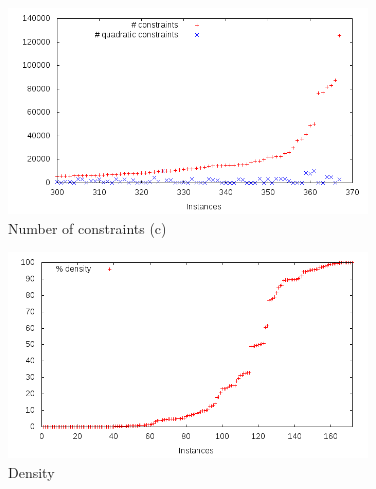 \begin{enumerate}
\begin{figure}\centering
  \includegraphics[width=0.85\textwidth]{pic_constr_big.png}
  \caption{Number of constraints (c) \label{fig:pic_constr_big}}
\end{figure}




\begin{figure}\centering
  \includegraphics[width=0.85\textwidth]{pic_density.png}
  \caption{Density \label{fig:pic_density}}
\end{figure}


\end{enumerate}
